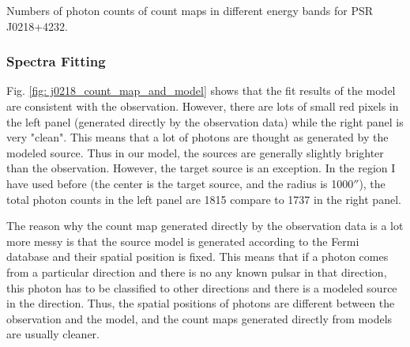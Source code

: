 \documentclass[12pt]{report}
\newcommand{\mycaption}[1]{\protect \caption{#1}}
\begin{document}
          \begin{table}[!h]   
            \centering
            \mycaption{Numbers of photon counts of count maps in different energy bands for 
                  PSR J0218+4232.}
            \label{table:j0218_ccube_photon_counts}
          \end{table}
          \subsubsection{Spectra Fitting}
            Fig. \ref{fig: j0218_count_map_and_model} shows that the fit results of the model 
            are consistent with the observation. However, there are lots of small red pixels 
            in the left panel (generated directly by the observation data) while the 
            right panel is very "clean". This means that a lot of photons are thought as 
            generated by the modeled source. Thus in our model, the sources are generally 
            slightly brighter than the observation. However, the target
            source is an exception. In the region I have used before (the center is the 
            target source, and the radius is 1000$''$), the total photon counts in the left 
            panel are 1815 compare to 1737 in the right panel. 

            The reason why the count map generated directly by the observation data is a lot 
            more messy is that the source model is generated according to the Fermi database 
            and their spatial position is fixed. This means that if 
            a photon comes from a particular direction and there is no any known pulsar in 
            that direction, this photon has to be classified to other directions and there 
            is a modeled source in the direction.  Thus, the spatial positions of photons are 
            different between the observation and the model, and the count maps generated 
            directly from models are usually cleaner. 
            
\end{document}
